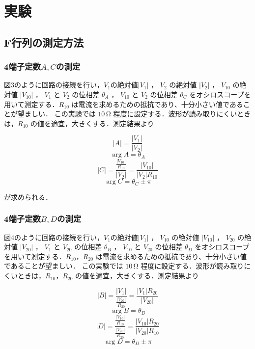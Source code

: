 
\section{実験}
\subsection{F行列の測定方法}
\subsubsection{4端子定数$A,C$の測定}
図3のように回路の接続を行い，$V_1$の絶対値$\left|V_1\right|$ ， $V_2$ の絶対値 $\left|V_2\right|$ ， $V_{10}$ の絶対値 $\left|V_{10}\right|$ ， $V_1$ と $V_2$ の位相差 $\theta_A$ ， $V_{10}$ と $V_2$ の位相差 $\theta_C$
をオシロスコープを用いて測定する．$R_{10}$ は電流を求めるための抵抗であり、十分小さい値であることが望ましい．
この実験では $10\,\si{\ohm}$ 程度に設定する．波形が読み取りにくいときは，$R_{10}$ の値を適宜，大きくする．測定結果より

$$
|A|=\frac{\left|V_1\right|}{\left|V_2\right|}
$$
$$
\arg A=\theta_A
$$
$$
|C|=\frac{\frac{\left|V_{10}\right|}{R_{10}}}{\left|V_2\right|}=\frac{\left|V_{10}\right|}{\left|V_2\right| R_{10}}
$$
$$
\arg C=\theta_C \pm \pi
$$

が求められる．
\subsubsection{4端子定数$B,D$の測定}
図4のように回路の接続を行い，$V_1$の絶対値$\left|V_1\right|$ ， $V_{10}$ の絶対値 $\left|V_{10}\right|$ ， $V_{20}$ の絶対値 $\left|V_{20}\right|$ ， $V_1$ と $V_{20}$ の位相差 $\theta_B$ ， $V_{10}$ と $V_{20}$ の位相差 $\theta_D$
をオシロスコープを用いて測定する．$R_{10}$，$R_{20}$ は電流を求めるための抵抗であり、十分小さい値であることが望ましい．
この実験では $10\,\si{\ohm}$ 程度に設定する．波形が読み取りにくいときは，$R_{10}$，$R_{20}$ の値を適宜，大きくする．測定結果より

$$
|B|=\frac{\left|V_1\right|}{\frac{\left|V_{20}\right|}{R_{20}}}=\frac{\left|V_1\right| R_{20}}{\left|V_{20}\right|}
$$
$$
\arg B=\theta_B
$$
$$
|D|=\frac{\frac{\left|V_{10}\right|}{R_{10}}}{\frac{\left|V_{20}\right|}{R_{20}}}=\frac{\left|V_{10}\right| R_{20}}{\left|V_{20}\right| R_{10}}
$$
$$
\arg D=\theta_D \pm \pi
$$



